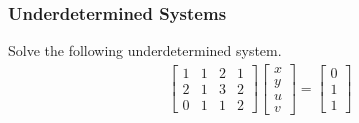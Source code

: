 \subsubsection{Underdetermined Systems}
\begin{exmp}
Solve the following underdetermined system.
\begin{align*}
\begin{bmatrix}
1 & 1 & 2 & 1 \\
2 & 1 & 3 & 2 \\
0 & 1 & 1 & 2 
\end{bmatrix}
\begin{bmatrix}
x \\
y \\
u \\
v
\end{bmatrix}
=
\begin{bmatrix}
0 \\
1 \\
1
\end{bmatrix}
\end{align*}
\end{exmp}
